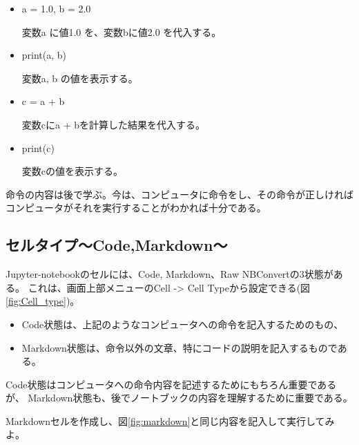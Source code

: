 \begin{itemize}
\item {\ttfamily a = 1.0, b = 2.0} 	

変数{\ttfamily a} に値1.0 を、変数{\ttfamily b}に値2.0 を代入する。

\item {\ttfamily print(a, b)} 	

変数{\ttfamily a, b} の値を表示する。

\item {\ttfamily c = a + b} 	

変数{\ttfamily c}に{\ttfamily a + b}を計算した結果を代入する。

\item {\ttfamily print(c)} 	

変数{\ttfamily c}の値を表示する。


\end{itemize}
\noindent
命令の内容は後で学ぶ。今は、コンピュータに命令をし、その命令が正しければコンピュータがそれを実行することがわかれば十分である。

\subsection{セルタイプ〜Code,Markdown〜}
Jupyter-notebookのセルには、{\ttfamily Code, Markdown、Raw NBConvert}の3状態がある。
これは、画面上部メニューの{\ttfamily Cell -> Cell Type}から設定できる(図\ref{fig:Cell_type})。
\begin{itemize}
\item {\ttfamily Code}状態は、上記のようなコンピュータへの命令を記入するためのもの、
\item {\ttfamily Markdown}状態は、命令以外の文章、特にコードの説明を記入するものである。
\end{itemize}

\noindent
{\ttfamily Code}状態はコンピュータへの命令内容を記述するためにもちろん重要であるが、
{\ttfamily Markdown}状態も、後でノートブックの内容を理解するために重要である。

Markdownセルを作成し、図\ref{fig:markdown}と同じ内容を記入して実行してみよ。



